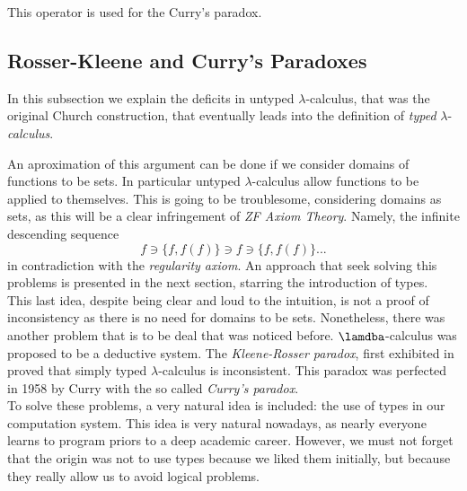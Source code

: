 This operator is used for the Curry's paradox.\\

\subsection{Rosser-Kleene and Curry's Paradoxes}

In this subsection we explain the deficits in untyped $\lambda$-calculus, that was the original Church construction, that eventually leads into the definition of \emph{typed} $\lambda$-\emph{calculus}.

An aproximation of this argument can be done if we consider domains of functions to be sets. In particular untyped $\lambda$-calculus allow functions to be applied to themselves. This is going to be troublesome, considering domains as sets, as this will be a clear infringement of \emph{ZF Axiom Theory}\cite{kunen2014set}. Namely, the infinite descending sequence
$$f\ni \{f,f(f)\}\ni f \ni \{f,f(f)\}...$$
in contradiction with the \emph{regularity axiom}. An approach that seek solving this problems is presented in the next section, starring the introduction of types.  \\

This last idea, despite being clear and loud to the intuition, is not a proof of inconsistency as there is no need for domains to be sets. Nonetheless, there was another problem that is to be deal that was noticed before. $\lamdba$-calculus was proposed to be a deductive system. The  \emph{Kleene-Rosser paradox}, first exhibited in \cite{kleene1935inconsistency} proved that simply typed $\lambda$-calculus is inconsistent. This paradox was perfected in 1958 by Curry \cite{curry1958combinatory} with the so called \emph{Curry's paradox}. \\

 To solve these problems, a very natural idea is included: the use of types in our computation system. This idea is very natural nowadays, as nearly everyone learns to program priors to a deep academic career. However, we must not forget that the origin was not to use types because we liked them initially, but because they really allow us to avoid logical problems.  

